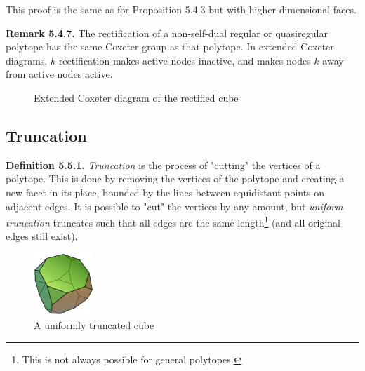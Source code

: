 \documentclass[../main.tex]{subfiles}
\begin{document}
This proof is the same as for Proposition 5.4.3 but with higher-dimensional faces.\newline

\noindent\textbf{Remark 5.4.7.} The rectification of a non-self-dual regular or quasiregular polytope has the same Coxeter group as that polytope. In extended Coxeter diagrams, $k$-rectification makes active nodes inactive, and makes nodes $k$ away from active nodes active.

\begin{figure}[!h]
\centering
{}
\caption{Extended Coxeter diagram of the rectified cube}
\end{figure}

\subsection{Truncation}

\noindent\textbf{Definition 5.5.1.} \textit{Truncation} is the process of "cutting" the vertices of a polytope. This is done by removing the vertices of the polytope and creating a new facet in its place, bounded by the lines between equidistant points on adjacent edges. It is possible to "cut" the vertices by any amount, but \textit{uniform truncation} truncates such that all edges are the same length\footnote{This is not always possible for general polytopes.} (and all original edges still exist).\newline

\begin{figure}[ht]
    \centering
    \includegraphics[width=0.2\textwidth]{uniform/Truncated_cube.png}
    \caption{A uniformly truncated cube}
    \label{}
\end{figure}
\end{document}
